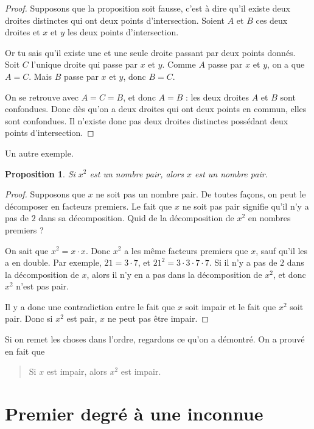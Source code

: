 \documentclass[a4paper,12pt]{book}
\newcounter{numtho}
\theoremstyle{mes_exemples}	\newtheorem{exemple}[numtho]{Exemple}
\theoremstyle{mes_tho}
\newtheorem{proposition}[numtho]{Proposition}
\begin{document}
\begin{proof}
Supposons que la proposition soit fausse, c'est à dire qu'il existe deux droites distinctes qui ont deux points d'intersection. Soient $A$ et $B$ ces deux droites et $x$ et $y$ les deux points d'intersection.

Or tu sais qu'il existe une et une seule droite passant par deux points donnés. Soit $C$ l'unique droite qui passe par $x$ et $y$. Comme $A$ passe par $x$ et $y$, on a que $A=C$. Mais $B$ passe par $x$ et $y$, donc $B=C$.

On se retrouve avec $A=C=B$, et donc $A=B$ : les deux droites $A$ et $B$ sont confondues. Donc dès qu'on a deux droites qui ont deux points en commun, elles sont confondues. Il n'existe donc pas deux droites distinctes possédant deux points d'intersection.

\end{proof}

Un autre exemple.

\begin{proposition}
Si $x^2$ est un nombre pair, alors $x$ est un nombre pair.
\end{proposition}

\begin{proof}
Supposons que $x$ ne soit pas un nombre pair. De toutes façons, on peut le décomposer en facteurs premiers. Le fait que $x$ ne soit pas pair signifie qu'il n'y a pas de $2$ dans sa décomposition. Quid de la décomposition de $x^2$ en nombres premiers ?

On sait que $x^2=x\cdot x$. Donc $x^2$ a les même facteurs premiers que $x$, sauf qu'il les a en double. Par exemple, $21=3\cdot 7$, et $21^2=3\cdot 3\cdot 7\cdot 7$. Si il n'y a pas de $2$ dans la décomposition de $x$, alors il n'y en a pas dans la décomposition de $x^2$, et donc $x^2$ n'est pas pair.

Il y a donc une contradiction entre le fait que $x$ soit impair et le fait que $x^2$ soit pair. Donc si $x^2$ est pair, $x$ ne peut pas être impair.
\end{proof}

Si on remet les choses dans l'ordre, regardons ce qu'on a démontré. On a prouvé en fait que 
\begin{quote}
Si $x$ est impair, alors $x^2$ est impair.
\end{quote}

\section{Premier degré à une inconnue}
\end{document}
